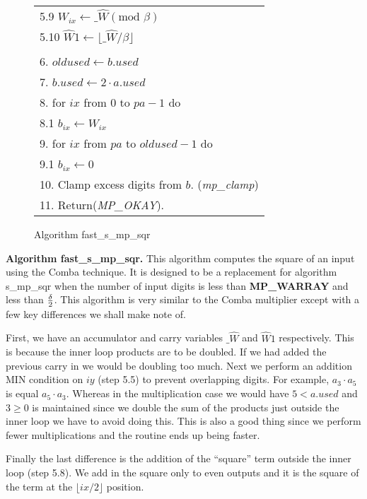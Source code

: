 \documentclass[b5paper]{book}
\begin{document}
\begin{figure}[!here]
\begin{small}
\begin{center}
\begin{tabular}{l}
\hspace{3mm}5.9  $W_{ix} \leftarrow \_ \hat W (\mbox{mod }\beta)$ \\
\hspace{3mm}5.10  $\hat W1 \leftarrow \lfloor \_ \hat W / \beta \rfloor$ \\
\\
6.  $oldused \leftarrow b.used$ \\
7.  $b.used \leftarrow 2 \cdot a.used$ \\
8.  for $ix$ from $0$ to $pa - 1$ do \\
\hspace{3mm}8.1  $b_{ix} \leftarrow W_{ix}$ \\
9.  for $ix$ from $pa$ to $oldused - 1$ do \\
\hspace{3mm}9.1  $b_{ix} \leftarrow 0$ \\
10.  Clamp excess digits from $b$.  (\textit{mp\_clamp}) \\
11.  Return(\textit{MP\_OKAY}). \\ 
\hline
\end{tabular}
\end{center}
\end{small}
\caption{Algorithm fast\_s\_mp\_sqr}
\end{figure}

\textbf{Algorithm fast\_s\_mp\_sqr.}
This algorithm computes the square of an input using the Comba technique.  It is designed to be a replacement for algorithm 
s\_mp\_sqr when the number of input digits is less than \textbf{MP\_WARRAY} and less than $\delta \over 2$.  
This algorithm is very similar to the Comba multiplier except with a few key differences we shall make note of.

First, we have an accumulator and carry variables $\_ \hat W$ and $\hat W1$ respectively.  This is because the inner loop
products are to be doubled.  If we had added the previous carry in we would be doubling too much.  Next we perform an
addition MIN condition on $iy$ (step 5.5) to prevent overlapping digits.  For example, $a_3 \cdot a_5$ is equal
$a_5 \cdot a_3$.  Whereas in the multiplication case we would have $5 < a.used$ and $3 \ge 0$ is maintained since we double the sum
of the products just outside the inner loop we have to avoid doing this.  This is also a good thing since we perform
fewer multiplications and the routine ends up being faster.

Finally the last difference is the addition of the ``square'' term outside the inner loop (step 5.8).  We add in the square
only to even outputs and it is the square of the term at the $\lfloor ix / 2 \rfloor$ position.
\end{document}
